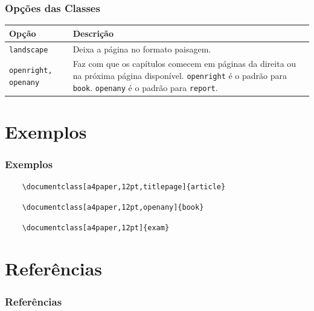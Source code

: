 \documentclass{beamer}
\begin{document}
\begin{frame}
    \frametitle{Opções das Classes}
\begin{table}[h]\small
    \begin{tabularx}{\textwidth}{XX}
        \hline
        \textbf{Opção} & \textbf{Descrição} \\ \hline
        \lstinline!landscape! & Deixa a página no formato paisagem. \\ \hline
        \lstinline!openright, openany! & Faz com que os capítulos comecem em páginas da direita ou na próxima página disponível. \lstinline!openright! é o padrão para \lstinline!book!. \lstinline!openany! é o padrão para \lstinline!report!. \\ \hline
    \end{tabularx}
\end{table}
\end{frame}

\section{Exemplos}

\begin{frame}[fragile]
    \frametitle{Exemplos}
\begin{lstlisting}
    \documentclass[a4paper,12pt,titlepage]{article}
\end{lstlisting}
\begin{lstlisting}
    \documentclass[a4paper,12pt,openany]{book}
\end{lstlisting}
\begin{lstlisting}
    \documentclass[a4paper,12pt]{exam}
\end{lstlisting}

\end{frame}

\section{Referências}
\begin{frame}
    \frametitle{Referências}
    \nocite{WikibooksLatex,BeamerDocumentation,ExamDocumentation,latex24h}
    \printbibliography[]

\end{frame}
\end{document}
